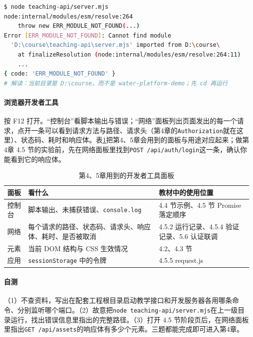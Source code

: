\begin{lstlisting}[label={lst:prep-p0-error},language=bash,caption={一条典型的错误信息：先看错误码与路径}]
$ node teaching-api/server.mjs
node:internal/modules/esm/resolve:264
    throw new ERR_MODULE_NOT_FOUND(...)
Error [ERR_MODULE_NOT_FOUND]: Cannot find module
  'D:\course\teaching-api\server.mjs' imported from D:\course\
    at finalizeResolution (node:internal/modules/esm/resolve:264:11)
    ...
{ code: 'ERR_MODULE_NOT_FOUND' }
# 解读：当前目录是 D:\course，而不是 water-platform-demo；先 cd 再运行
\end{lstlisting}

\paragraph{浏览器开发者工具}按 F12 打开。“控制台”看脚本输出与错误；“网络”面板列出页面发出的每一个请求，点开一条可以看到请求方法与路径、请求头（第4章的\texttt{Authorization}就在这里）、状态码、耗时和响应体。表\ref{tab:prep-p0-panels}把第4、5章会用到的面板与用途对应起来；做第4章 4.5 节的实验前，先在网络面板里找到\texttt{POST /api/auth/login}这一条，确认你能看到它的响应体。

\begin{table}[htbp]
\centering
\caption{第4、5章用到的开发者工具面板}
\label{tab:prep-p0-panels}
\begin{tabular}{p{2.4cm}p{5.4cm}p{5.4cm}}
\toprule
面板 & 看什么 & 教材中的使用位置 \\
\midrule
控制台 & 脚本输出、未捕获错误、\texttt{console.log} & 4.4 节示例、4.5 节 Promise 落定顺序 \\
网络 & 每个请求的路径、状态码、请求头、响应体、耗时、是否被取消 & 4.5.2 运行记录、4.5.4 验证记录、5.6 认证联调 \\
元素 & 当前 DOM 结构与 CSS 生效情况 & 4.2、4.3 节 \\
应用 & \texttt{sessionStorage} 中的令牌 & 4.5.5 request.js \\
\bottomrule
\end{tabular}
\end{table}

\paragraph{自测}（1）不查资料，写出在配套工程根目录启动教学接口和开发服务器各用哪条命令、分别监听哪个端口。（2）故意把\texttt{node teaching-api/server.mjs}在上一级目录运行，找出错误信息里指出的完整路径。（3）打开 4.5 节阶段页后，在网络面板里指出\texttt{GET /api/assets}的响应体有多少个元素。三题都能完成即可进入第4章。

